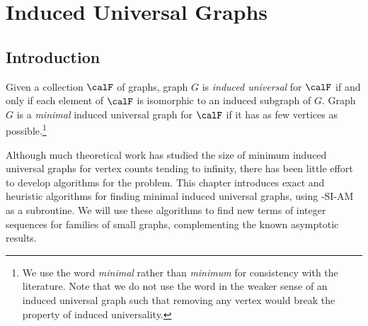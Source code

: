 \chapter{Induced Universal Graphs}
\label{c:universal-graphs}

%
%

\section{Introduction}

Given a collection $\calF$ of graphs, graph $G$ is \emph{induced universal} for
$\calF$ if and only if each element of $\calF$ is isomorphic to an induced subgraph of $G$.
Graph $G$ is a \emph{minimal} induced universal graph for $\calF$ if it has as
few vertices as possible.\footnote{We use the word \emph{minimal}
rather than \emph{minimum} for consistency
with the literature. Note that we do not use the word in the weaker sense
of an induced universal graph such that removing any vertex would break the property of induced
universality.}

Although much theoretical work has studied the size of minimum
induced universal graphs for vertex counts tending to infinity, there
has been little effort to develop algorithms
for the problem.
This chapter introduces exact and heuristic algorithms for finding
minimal induced universal graphs, using
\McSplit-SI-AM as a subroutine.
We will use these algorithms to find
new terms of integer sequences for
families of small graphs, complementing the known asymptotic results.

